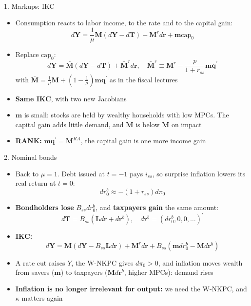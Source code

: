 \documentclass[10pt,english]{beamer}
\begin{document}
\begin{frame}{1. Markups: IKC}
\begin{itemize}
\item <+->Consumption reacts to labor income, to the rate and to the capital gain:
\[
d\boldsymbol{Y}=\frac{1}{\mu}\boldsymbol{M}\left(d\boldsymbol{Y}-d\boldsymbol{T}\right)+\boldsymbol{M}^{r}d\boldsymbol{r}+\boldsymbol{m}\text{cap}_{0}
\]
\item <+->Replace $\text{cap}_{0}$:
\[
d\boldsymbol{Y}=\bar{\boldsymbol{M}}\left(d\boldsymbol{Y}-d\boldsymbol{T}\right)+\bar{\boldsymbol{M}}^{r}d\boldsymbol{r},\quad\bar{\boldsymbol{M}}^{r}\equiv\boldsymbol{M}^{r}-\frac{p}{1+r_{ss}}\boldsymbol{m}\boldsymbol{q}^{\prime}
\]
with $\bar{\boldsymbol{M}}=\frac{1}{\mu}\boldsymbol{M}+\left(1-\frac{1}{\mu}\right)\boldsymbol{m}\boldsymbol{q}^{\prime}$ as in the fiscal lectures
\item <+->\textbf{Same IKC}, with two new Jacobians
\item <+->$\boldsymbol{m}$ is small: stocks are held by wealthy households with low MPCs. The capital gain adds little demand, and $\bar{\boldsymbol{M}}$ is below $\boldsymbol{M}$ on impact
\item <+->\textbf{RANK:} $\boldsymbol{m}\boldsymbol{q}^{\prime}=\boldsymbol{M}^{RA}$, the capital gain is one more income gain
\end{itemize}
\end{frame}
%
\begin{frame}{2. Nominal bonds}
\vspace{-1mm}
\begin{itemize}
\item <+->Back to $\mu=1$. Debt issued at $t=-1$ pays $i_{ss}$, so surprise inflation lowers its real return at $t=0$:
\[
dr_{0}^{b}\approx-(1+r_{ss})d\pi_{0}
\]
\item <+->\textbf{Bondholders lose} $B_{ss}dr_{0}^{b}$, and \textbf{taxpayers gain} the same amount:
\[
d\boldsymbol{T}=B_{ss}\left(\boldsymbol{L}d\boldsymbol{r}+d\boldsymbol{r}^{b}\right),\quad d\boldsymbol{r}^{b}=(dr_{0}^{b},0,0,\dots)^{\prime}
\]
\item <+->\textbf{IKC:}
\[
d\boldsymbol{Y}=\boldsymbol{M}\left(d\boldsymbol{Y}-B_{ss}\boldsymbol{L}d\boldsymbol{r}\right)+\boldsymbol{M}^{r}d\boldsymbol{r}+B_{ss}\left(\boldsymbol{m}dr_{0}^{b}-\boldsymbol{M}d\boldsymbol{r}^{b}\right)
\]
\item <+->A rate cut raises $Y$, the W-NKPC gives $d\pi_{0}>0$, and inflation moves wealth from savers ($\boldsymbol{m}$) to taxpayers ($\boldsymbol{M}d\boldsymbol{r}^{b}$, higher MPCs): demand rises
\item <+->\textbf{Inflation is no longer irrelevant for output:} we need the W-NKPC, and $\kappa$ matters again
\end{itemize}
\end{frame}
\end{document}
